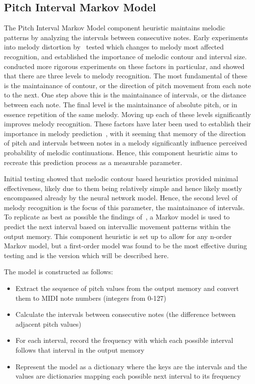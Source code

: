 \subsection{Pitch Interval Markov Model}

The Pitch Interval Markov Model component heuristic maintains melodic patterns by analyzing the intervals between consecutive notes. Early experiments into melody distortion by~\cite{White1960MelodyRecognition} tested which changes to melody most affected recognition, and established the importance of melodic contour and interval size.~\cite{Dowling1971Contour} conducted more rigorous experiments on these factors in particular, and showed that there are three levels to melody recognition. The most fundamental of these is the maintainance of contour, or the direction of pitch movement from each note to the next. One step above this is the maintainance of intervals, or the distance between each note. The final level is the maintainance of absolute pitch, or in essence repetition of the same melody. Moving up each of these levels significantly improves melody recognition. These factors have later been used to establish their importance in melody prediction~\citep{Temperley2008MelodyPerception}, with it seeming that memory of the direction of pitch and intervals between notes in a melody significantly influence perceived probability of melodic continuations. Hence, this component heuristic aims to recreate this prediction process as a measurable parameter.

Initial testing showed that melodic contour based heuristics provided minimal effectiveness, likely due to them being relatively simple and hence likely mostly encompassed already by the neural network model. Hence, the second level of melody recognition is the focus of this parameter, the maintainance of intervals. To replicate as best as possible the findings of~\cite{Temperley2008MelodyPerception}, a Markov model is used to predict the next interval based on intervallic movement patterns within the output memory. This component heuristic is set up to allow for any n-order Markov model, but a first-order model was found to be the most effective during testing and is the version which will be described here. 

The model is constructed as follows:
\begin{itemize}
    \item Extract the sequence of pitch values from the output memory and convert them to MIDI note numbers (integers from 0-127)
    \item Calculate the intervals between consecutive notes (the difference between adjacent pitch values)
    \item For each interval, record the frequency with which each possible interval follows that interval in the output memory
    \item Represent the model as a dictionary where the keys are the intervals and the values are dictionaries mapping each possible next interval to its frequency 
\end{itemize}

